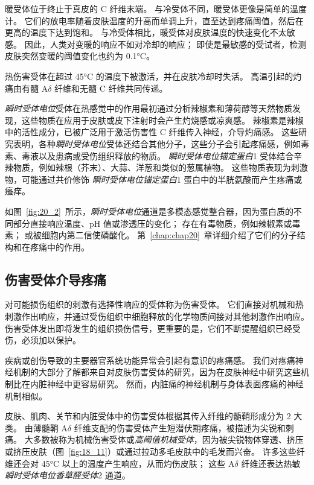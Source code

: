 暖受体位于终止于真皮的 C 纤维末端。
与冷受体不同，暖受体更像是简单的温度计。
它们的放电率随着皮肤温度的升高而单调上升，直至达到疼痛阈值，然后在更高的温度下达到饱和。
与冷受体相比，暖受体对皮肤温度的快速变化不太敏感。
因此，人类对变暖的响应不如对冷却的响应；
即使是最敏感的受试者，检测皮肤突然变暖的阈值变化也约为 0.1°C。


热伤害受体在超过 45°C 的温度下被激活，并在皮肤冷却时失活。
高温引起的灼痛由有髓 A$\delta$ 纤维和无髓 C 纤维共同传递。


\textit{瞬时受体电位}受体在热感觉中的作用最初通过分析辣椒素和薄荷醇等天然物质发现，这些物质在应用于皮肤或皮下注射时会产生灼烧感或凉爽感。
辣椒素是辣椒中的活性成分，已被广泛用于激活伤害性 C 纤维传入神经，介导灼痛感。
这些研究表明，各种\textit{瞬时受体电位}受体还结合其他分子，这些分子会引起疼痛感，例如毒素、毒液以及患病或受伤组织释放的物质。
\textit{瞬时受体电位锚定蛋白}1 受体结合辛辣物质，例如辣根（芥末）、大蒜、洋葱和类似的葱属植物。
这些物质表现为刺激物，可能通过共价修饰 \textit{瞬时受体电位锚定蛋白}1 蛋白中的半胱氨酸而产生疼痛或瘙痒。


如图~\ref{fig:20_2}~所示，\textit{瞬时受体电位}通道是多模态感觉整合器，因为蛋白质的不同部分直接响应温度、pH 值或渗透压的变化；
存在有毒物质，例如辣椒素或毒素；
或被细胞内第二信使磷酸化。
第~\ref{chap:chap20}~章详细介绍了它们的分子结构和在疼痛中的作用。



\subsection{伤害受体介导疼痛}

对可能损伤组织的刺激有选择性响应的受体称为伤害受体。
它们直接对机械和热刺激作出响应，并通过受伤组织中细胞释放的化学物质间接对其他刺激作出响应。
伤害受体发出即将发生的组织损伤信号，更重要的是，它们不断提醒组织已经受伤，必须加以保护。


疾病或创伤导致的主要器官系统功能异常会引起有意识的疼痛感。
我们对疼痛神经机制的大部分了解都来自对皮肤伤害受体的研究，因为在皮肤神经中研究这些机制比在内脏神经中更容易研究。
然而，内脏痛的神经机制与身体表面疼痛的神经机制相似。


皮肤、肌肉、关节和内脏受体中的伤害受体根据其传入纤维的髓鞘形成分为 2 大类。
由薄髓鞘 A$\delta$ 纤维支配的伤害受体产生短潜伏期疼痛，被描述为尖锐和刺痛。
大多数被称为机械伤害受体或\textit{高阈值机械受体}，因为被尖锐物体穿透、挤压或挤压皮肤（图~\ref{fig:18_11}）或通过拉动多毛皮肤中的毛发而兴奋。
许多这些纤维还会对 45°C 以上的温度产生响应，从而灼伤皮肤；
这些 A$\delta$ 纤维还表达热敏 \textit{瞬时受体电位香草醛受体}2 通道。


